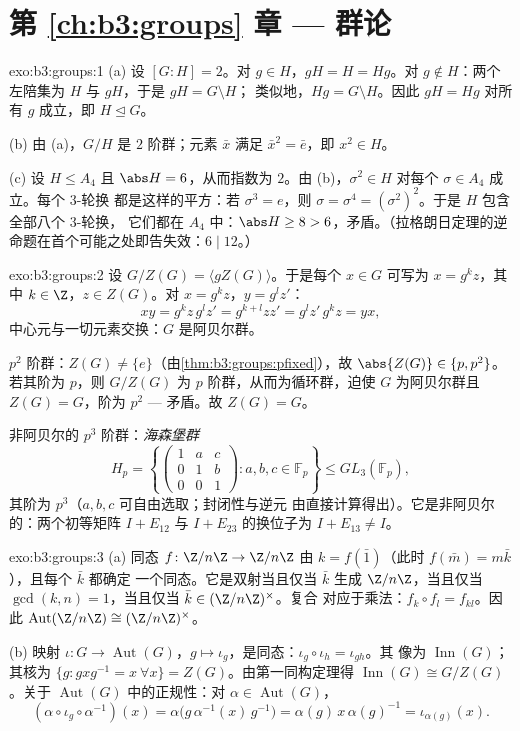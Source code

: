 \section*{第 \ref{ch:b3:groups} 章 --- 群论}

\begin{solution}{exo:b3:groups:1}
(a) 设 $[G:H] = 2$。对 $g \in H$，$gH = H = Hg$。对 $g \notin
H$：两个左陪集为 $H$ 与 $gH$，于是 $gH = G \setminus H$；
类似地，$Hg = G \setminus H$。因此 $gH = Hg$ 对所有 $g$ 成立，即 $H
\trianglelefteq G$。

(b) 由 (a)，$G/H$ 是 $2$ 阶群；元素 $\bar x$
满足 $\bar x^2 = \bar e$，即 $x^2 \in H$。

(c) 设 $H \leq A_4$ 且 $\abs H = 6$，从而指数为 $2$。由
(b)，$\sigma^2 \in H$ 对每个 $\sigma \in A_4$ 成立。每个 $3$-轮换
都是这样的平方：若 $\sigma^3 = e$，则 $\sigma =
\sigma^4 = (\sigma^2)^2$。于是 $H$ 包含全部八个 $3$-轮换，
它们都在 $A_4$ 中：$\abs H \geq 8 > 6$，矛盾。（拉格朗日定理的逆
命题在首个可能之处即告失效：$6 \mid 12$。）
\end{solution}

\begin{solution}{exo:b3:groups:2}
设 $G/Z(G) = \langle gZ(G) \rangle$。于是每个 $x \in G$ 可写为
$x = g^k z$，其中 $k \in \Z$，$z \in Z(G)$。对 $x = g^kz$，$y =
g^l z'$：
\[
xy = g^k z\, g^l z' = g^{k+l} z z' = g^l z'\, g^k z = yx,
\]
中心元与一切元素交换：$G$ 是阿贝尔群。

$p^2$ 阶群：$Z(G) \neq \{e\}$（由\cref{thm:b3:groups:pfixed}），故
$\abs{Z(G)} \in \{p, p^2\}$。若其阶为 $p$，则 $G/Z(G)$
为 $p$ 阶群，从而为循环群，迫使 $G$ 为阿贝尔群且 $Z(G) =
G$，阶为 $p^2$ --- 矛盾。故 $Z(G) = G$。

非阿贝尔的 $p^3$ 阶群：\emph{海森堡群}
\[
H_p = \left\{ \begin{pmatrix} 1 & a & c\\ 0 & 1 & b\\ 0 & 0 & 1
\end{pmatrix} : a, b, c \in \mathbb F_p \right\}
\leq GL_3(\mathbb F_p),
\]
其阶为 $p^3$（$a, b, c$ 可自由选取；封闭性与逆元
由直接计算得出）。它是非阿贝尔的：两个初等矩阵
$I + E_{12}$ 与 $I + E_{23}$ 的换位子为 $I + E_{13} \neq I$。
\end{solution}

\begin{solution}{exo:b3:groups:3}
(a) 同态 $f \colon \Z/n\Z \to \Z/n\Z$ 由 $k =
f(\bar 1)$（此时 $f(\bar m) = m\bar k$），且每个 $\bar k$ 都确定
一个同态。它是双射当且仅当 $\bar k$ 生成 $\Z/n\Z$，当且仅当
$\gcd(k,n) = 1$，当且仅当 $\bar k \in (\Z/n\Z)^\times$。复合
对应于乘法：$f_k \circ f_l = f_{kl}$。因此
$\operatorname{Aut}(\Z/n\Z) \cong (\Z/n\Z)^\times$。

(b) 映射 $\iota\colon G \to \operatorname{Aut}(G)$，$g \mapsto
\iota_g$，是同态：$\iota_g \circ \iota_h = \iota_{gh}$。其
像为 $\operatorname{Inn}(G)$；其核为 $\{g : gxg^{-1} =
x\ \forall x\} = Z(G)$。由第一同构定理得
$\operatorname{Inn}(G) \cong G/Z(G)$。关于
$\operatorname{Aut}(G)$ 中的正规性：对 $\alpha \in \operatorname{Aut}(G)$，
\[
(\alpha \circ \iota_g \circ \alpha^{-1})(x)
= \alpha\bigl(g\,\alpha^{-1}(x)\,g^{-1}\bigr)
= \alpha(g)\, x\, \alpha(g)^{-1} = \iota_{\alpha(g)}(x).
\]
\end{solution}

